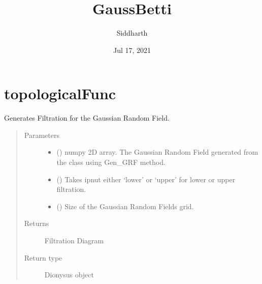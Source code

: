 \documentclass[letterpaper,10pt,english]{sphinxmanual}
\title{GaussBetti}
\date{Jul 17, 2021}
\author{Siddharth}
\begin{document}
\pagestyle{empty}
\sphinxmaketitle
\pagestyle{plain}
\sphinxtableofcontents
\pagestyle{normal}
\label{\detokenize{index::doc}}



\chapter{topologicalFunc}
\label{\detokenize{topologicalFunc:topologicalfunc}}\label{\detokenize{topologicalFunc:id1}}\label{\detokenize{topologicalFunc::doc}}\label{\detokenize{topologicalFunc:module-topologicalFunc}}

\begin{fulllineitems}
\label{\detokenize{topologicalFunc:topologicalFunc.GaussianFiltration}}
\sphinxAtStartPar
Generates Filtration for the Gaussian Random Field.
\begin{quote}\begin{description}
\item[{Parameters}] \leavevmode\begin{itemize}
\item {} 
\sphinxAtStartPar
{} () \textendash{} numpy 2\sphinxhyphen{}D array. The Gaussian Random Field generated from the class using Gen\_GRF method.

\item {} 
\sphinxAtStartPar
{} () \textendash{} Takes ipnut either ‘lower’ or ‘upper’ for lower or upper filtration.

\item {} 
\sphinxAtStartPar
{} () \textendash{} Size of the Gaussian Random Fields grid.

\end{itemize}

\item[{Returns}] \leavevmode
\sphinxAtStartPar
Filtration Diagram

\item[{Return type}] \leavevmode
\sphinxAtStartPar
Dionysus object

\end{description}\end{quote}

\end{fulllineitems}
\end{document}
